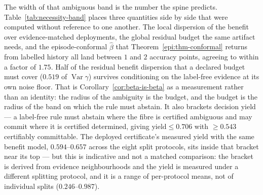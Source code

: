 The width of that ambiguous band is the number the spine predicts. Table~\ref{tab:necessity-band}
places three quantities side by side that were computed without reference to one another. The local
dispersion of the benefit over evidence-matched deployments, the global residual budget the same
artifact needs, and the episode-conformal $\widehat\beta$ that Theorem~\ref{epi:thm-conformal}
returns from labelled history all land between $1$ and $2$ accuracy points, agreeing to within a
factor of $1.75$. Half of the residual benefit dispersion that a declared budget must cover
($0.519$ of $\operatorname{Var}\gamma$) survives conditioning on the label-free evidence at its own
noise floor. That is Corollary~\ref{cor:beta-is-beta} as a measurement rather than an identity: the
radius of the ambiguity is the budget, and the budget is the radius of the band on which the rule
must abstain. It also brackets decision yield --- a label-free rule must abstain where the fibre is
certified ambiguous and may commit where it is certified determined, giving
$\text{yield}\le0.706$ with $\ge0.543$ certifiably committable. The deployed certificate's measured
yield with the same benefit model, $0.594$--$0.657$ across the eight split protocols, sits inside
that bracket near its top --- but this is indicative and not a matched comparison: the bracket is
derived from evidence neighbourhoods and the yield is measured under a different splitting
protocol, and it is a range of per-protocol means, not of individual splits ($0.246$--$0.987$).

